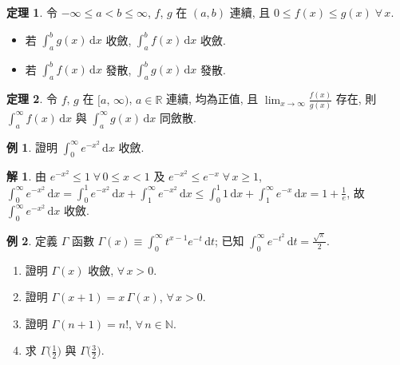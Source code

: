 \documentclass[12pt]{extarticle}
\newcommand{\ds}{\displaystyle}
\theoremstyle{definition}
\newtheorem*{thm}{定理}
\newtheorem*{ex}{例}
\newtheorem*{sol}{解}
\begin{document}
\begin{thm}
  令 $\ds -\infty\leqslant a < b \leqslant\infty$, $f$, $g$ 在 $(a, b)$ 連續, 且 $0\leqslant f(x)\leqslant g(x)\;\forall\,x$. 
  \begin{multicols}{2}
    \begin{itemize}\setlength{\itemsep}{0pt}
      \item 若 $\ds\int_a^b g(x)\,\text{d}x$ 收斂, $\ds\int_a^b f(x)\,\text{d}x$ 收斂. 
      \item 若 $\ds\int_a^b f(x)\,\text{d}x$ 發散, $\ds\int_a^b g(x)\,\text{d}x$ 發散. 
    \end{itemize}
  \end{multicols}
\end{thm}

\begin{thm}
  令 $f$, $g$ 在 $[a,\,\infty)$, $a\in\mathbb{R}$ 連續, 均為正值, 且 $\ds\lim_{x\to\infty}\frac{f(x)}{g(x)}$ 存在, 則 $\ds\int_a^\infty\!f(x)\,\text{d}x$ 與 $\ds\int_a^\infty\!g(x)\,\text{d}x$ 同斂散. 
\end{thm}

\begin{ex}
  證明 $\ds\int_0^\infty\!e^{-x^2}\,\text{d}x$ 收斂. 
\end{ex}

\begin{sol}
  由 $\ds e^{-x^2}\leqslant 1\;\forall\,0 \leqslant x < 1$ 及 $\ds e^{-x^2}\leqslant e^{-x}\;\forall\,x\geqslant 1$, $\ds\int_0^\infty\!e^{-x^2}\,\text{d}x = \int_0^1\!e^{-x^2}\,\text{d}x + \int_1^\infty\!e^{-x^2}\,\text{d}x\leqslant\int_0^1\!1\,\text{d}x + \int_1^\infty\!e^{-x}\,\text{d}x = 1 + \frac{1}{e}$, 故 $\ds\int_0^\infty\!e^{-x^2}\,\text{d}x$ 收斂. 
\end{sol}

\begin{ex}%
  定義 $\Gamma$ 函數 $\ds\Gamma(x)\equiv\int_0^\infty\!t^{x - 1}e^{-t}\,\text{d}t$; 已知 $\ds\int_0^\infty\!e^{-t^2}\,\text{d}t = \frac{\sqrt{\pi}}{2}$. 
  \setlength{\columnsep}{-2mm}
  \begin{multicols}{2}
    \begin{enumerate}\setlength{\itemsep}{0pt}
      \item 證明 $\ds\Gamma(x)$ 收斂, $\ds\forall\,x > 0$. 
      \item 證明 $\ds\Gamma(x + 1) = x\,\Gamma(x)$, $\ds\forall\,x > 0$. 
      \item 證明 $\ds\Gamma(n + 1) = n!$, $\ds\forall\,n\in\mathbb{N}$. 
      \item 求 $\ds\Gamma\Big(\frac{1}{2}\Big)$ 與 $\ds\Gamma\Big(\frac{3}{2}\Big)$. 
    \end{enumerate}
  \end{multicols}
\end{ex}
\end{document}
